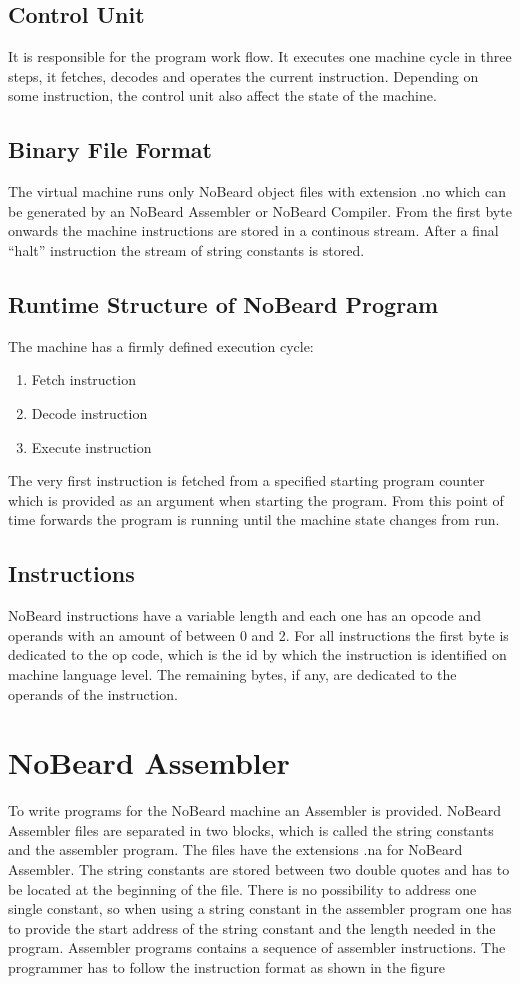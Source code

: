 \subsection{Control Unit}
It is responsible for the program work flow. It executes one machine cycle in three steps, it fetches, decodes and operates the current instruction. Depending on some instruction, the control unit also affect the state of the machine. 
\subsection{Binary File Format}
The virtual machine runs only NoBeard object files with extension .no which can be generated by an NoBeard Assembler or NoBeard Compiler. From the first byte onwards the machine instructions are stored in a continous stream. After a final “halt” instruction the stream of string constants is stored. 
\subsection{Runtime Structure of NoBeard Program}
The machine has a firmly defined execution cycle:
\begin{enumerate}
\item Fetch instruction
\item Decode instruction
\item Execute instruction
\end{enumerate}
The very first instruction is fetched from a specified starting program counter which is provided as an argument when starting the program. From this point of time forwards the program is running until the machine state changes from run. 
\subsection{Instructions}
NoBeard instructions have a variable length and each one has an opcode and operands with an amount of between 0 and 2. For all instructions the first byte is dedicated to the op code, which is the id by which the instruction is identified on machine language level. The remaining bytes, if any, are dedicated to the operands of the instruction. 
\section{NoBeard Assembler}
To write programs for the NoBeard machine an Assembler is provided. NoBeard Assembler files are separated in two blocks, which is called the string constants and the assembler program. The files have the extensions .na for NoBeard Assembler. The string constants are stored between two double quotes and has to be located at the beginning of the file. There is no possibility to address one single constant, so when using a string constant in the assembler program one has to provide the start address of the string constant and the length needed in the program.  Assembler programs contains a sequence of assembler instructions. The programmer has to follow the instruction format as shown in the figure